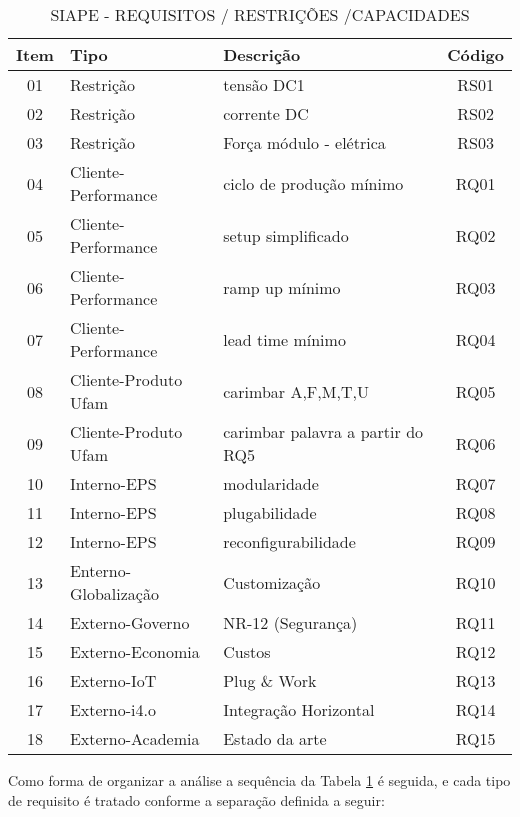 					\begin{table}[!h]
						\centering
						\caption{	SIAPE - REQUISITOS / RESTRIÇÕES /CAPACIDADES		}
						\begin{tabular}{ |c | p{4cm}| p{6cm}|c| } \hline
							\textbf{Item} 	   & \textbf{Tipo} &\textbf{ Descrição} & \textbf{Código}\\ \hline
							
							01   & Restrição & tensão DC1 & RS01 \\ \hline
							02   & Restrição & corrente DC & RS02 \\ \hline
							03   & Restrição & Força módulo - elétrica & RS03 \\ \hline
							04   & Cliente-Performance & ciclo de produção mínimo & RQ01 \\ \hline
							05   & Cliente-Performance & setup simplificado  & RQ02 \\ \hline
							06   & Cliente-Performance & ramp up mínimo & RQ03 \\ \hline
							07   & Cliente-Performance &  lead time mínimo& RQ04 \\ \hline
							08   & Cliente-Produto Ufam & carimbar A,F,M,T,U & RQ05 \\ \hline
							09   & Cliente-Produto Ufam & carimbar palavra a partir do RQ5 & RQ06 \\ \hline
							10   & Interno-EPS & modularidade & RQ07 \\ \hline
							11   & Interno-EPS & plugabilidade & RQ08 \\ \hline
							12   & Interno-EPS & reconfigurabilidade & RQ09 \\ \hline
							13   & Enterno-Globalização & Customização & RQ10 \\ \hline
							14   & Externo-Governo & NR-12 (Segurança) & RQ11 \\ \hline
							15   & Externo-Economia & Custos & RQ12 \\ \hline
							16   & Externo-IoT & Plug \& Work & RQ13 \\ \hline
							17   & Externo-i4.o & Integração Horizontal & RQ14 \\ \hline
							18   & Externo-Academia & Estado da arte & RQ15 \\ \hline
						\end{tabular}												
						\label{T14}\par
					\end{table}
		Como forma de organizar a análise a sequência da Tabela \ref{T14} é seguida, e cada tipo de requisito é tratado conforme a separação definida a seguir:  
		
